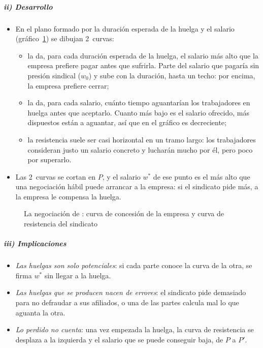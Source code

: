 \documentclass[11pt]{article}
\begin{document}
\subparagraph{ii) Desarrollo}

\begin{itemize}
\item En el plano formado por la duración esperada de la huelga y el salario (gráfico~\ref{fig:hicks}) se dibujan 2~curvas:
  \begin{itemize}
  \item la  da, para cada duración esperada de la huelga, el salario más alto que la empresa prefiere pagar antes que sufrirla. Parte del salario que pagaría sin presión sindical ($w_0$) y sube con la duración, hasta un techo: por encima, la empresa prefiere cerrar;
  \item la  da, para cada salario, cuánto tiempo aguantarían los trabajadores en huelga antes que aceptarlo. Cuanto más bajo es el salario ofrecido, más dispuestos están a aguantar, así que en el gráfico es decreciente;
  \item la resistencia suele ser casi horizontal en un tramo largo: los trabajadores consideran justo un salario concreto y lucharán mucho por él, pero poco por superarlo.
  \end{itemize}
\item Las 2~curvas se cortan en $P$, y el salario $w^*$ de ese punto es el más alto que una negociación hábil puede arrancar a la empresa: si el sindicato pide más, a la empresa le compensa la huelga.
\end{itemize}

\begin{figure}[H]
\centering
\caption{La negociación de : curva de concesión de la empresa y curva de resistencia del sindicato}\label{fig:hicks}
\end{figure}

\subparagraph{iii) Implicaciones}

\begin{itemize}
\item \emph{Las huelgas son solo potenciales}: si cada parte conoce la curva de la otra, se firma $w^*$ sin llegar a la huelga.
\item \emph{Las huelgas que se producen nacen de errores}: el sindicato pide demasiado para no defraudar a sus afiliados, o una de las partes calcula mal lo que aguanta la otra.
\item \emph{Lo perdido no cuenta}: una vez empezada la huelga, la curva de resistencia se desplaza a la izquierda y el salario que se puede conseguir baja, de $P$ a $P'$\nocite{Hicks1932Theory}.
\end{itemize}
\end{document}

